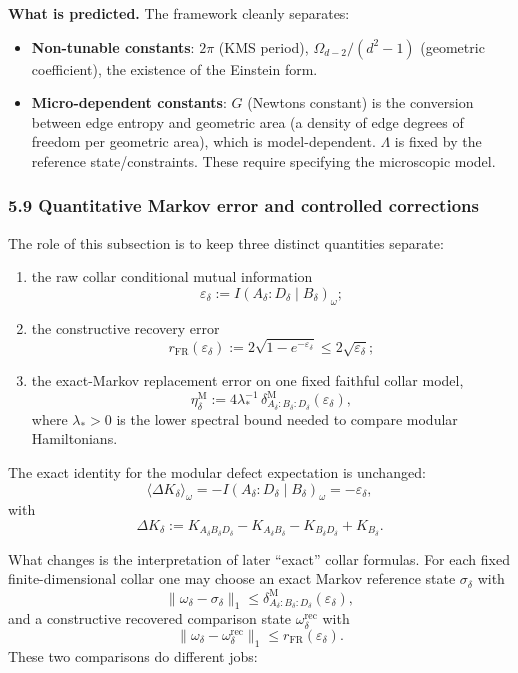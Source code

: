 \textbf{What is predicted.} The framework cleanly separates:

\begin{itemize}
\tightlist
\item
  \textbf{Non-tunable constants}: \(2\pi\) (KMS period), \(\Omega_{d-2}/(d^2-1)\) (geometric coefficient), the existence of the Einstein form.
\item
  \textbf{Micro-dependent constants}: \(G\) (Newton\textquotesingle s constant) is the conversion between edge entropy and geometric area (a density of edge degrees of freedom per geometric area), which is model-dependent. \(\Lambda\) is fixed by the reference state/constraints. These require specifying the microscopic model.
\end{itemize}

\subsubsection{5.9 Quantitative Markov error and controlled corrections}\label{59-quantitative-markov-error-and-controlled-corrections}

The role of this subsection is to keep three distinct quantities separate:

\begin{enumerate}
\def\labelenumi{\arabic{enumi}.}
\tightlist
\item
the raw collar conditional mutual information
\[
\varepsilon_\delta:=I(A_\delta:D_\delta\mid B_\delta)_\omega;
\]
\item
the constructive recovery error
\[
r_{\mathrm{FR}}(\varepsilon_\delta)
:=
2\sqrt{1-e^{-\varepsilon_\delta}}
\le
2\sqrt{\varepsilon_\delta};
\]
\item
the exact-Markov replacement error on one fixed faithful collar model,
\[
\eta_\delta^{\mathrm M}
:=
4\lambda_\ast^{-1}\,
\delta^{\mathrm M}_{A_\delta:B_\delta:D_\delta}(\varepsilon_\delta),
\]
where \(\lambda_\ast>0\) is the lower spectral bound needed to compare modular Hamiltonians.
\end{enumerate}

The exact identity for the modular defect expectation is unchanged:
\[
\langle \Delta K_\delta\rangle_\omega
=
-I(A_\delta:D_\delta\mid B_\delta)_\omega
=
-\varepsilon_\delta,
\]
with
\[
\Delta K_\delta
:=
K_{A_\delta B_\delta D_\delta}
-K_{A_\delta B_\delta}
-K_{B_\delta D_\delta}
+K_{B_\delta}.
\]

What changes is the interpretation of later ``exact'' collar formulas. For each fixed finite-dimensional collar one may choose an exact Markov reference state \(\sigma_\delta\) with
\[
\|\omega_\delta-\sigma_\delta\|_1
\le
\delta^{\mathrm M}_{A_\delta:B_\delta:D_\delta}(\varepsilon_\delta),
\]
and a constructive recovered comparison state \(\omega_\delta^{\mathrm{rec}}\) with
\[
\|\omega_\delta-\omega_\delta^{\mathrm{rec}}\|_1
\le
r_{\mathrm{FR}}(\varepsilon_\delta).
\]
These two comparisons do different jobs:

